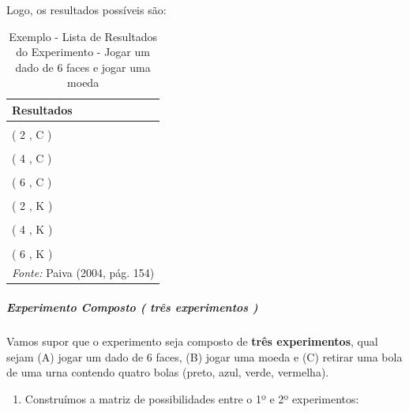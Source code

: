 \documentclass[
]{book}
\providecommand{\tightlist}{%
  \setlength{\itemsep}{0pt}\setlength{\parskip}{0pt}}
\begin{document}
Logo, os resultados possíveis são:

\begin{table}

\caption{\label{tab:unnamed-chunk-2}Exemplo - Lista de Resultados do Experimento - Jogar um dado de 6 faces e jogar uma moeda}
\centering
\begin{tabular}[t]{l}
\toprule
Resultados\\
\midrule
\cellcolor{gray!6}{( 1 , C )}\\
( 2 , C )\\
\cellcolor{gray!6}{( 3 , C )}\\
( 4 , C )\\
\cellcolor{gray!6}{( 5 , C )}\\
\addlinespace
( 6 , C )\\
\cellcolor{gray!6}{( 1 , K )}\\
( 2 , K )\\
\cellcolor{gray!6}{( 3 , K )}\\
( 4 , K )\\
\addlinespace
\cellcolor{gray!6}{( 5 , K )}\\
( 6 , K )\\
\bottomrule
\multicolumn{1}{l}{\rule{0pt}{1em}\textit{Fonte: } Paiva (2004, pág. 154)}\\
\end{tabular}
\end{table}

\hypertarget{experimento-composto-truxeas-experimentos}{%
\subparagraph{Experimento Composto ( três experimentos )}\label{experimento-composto-truxeas-experimentos}}

Vamos supor que o experimento seja composto de \textbf{três experimentos}, qual sejam (A) jogar um dado de 6 faces, (B) jogar uma moeda e (C) retirar uma bola de uma urna contendo quatro bolas (preto, azul, verde, vermelha).

\begin{enumerate}
\def\labelenumi{\arabic{enumi}.}
\tightlist
\item
  Construímos a matriz de possibilidades entre o 1º e 2º experimentos:
\end{enumerate}
\end{document}
